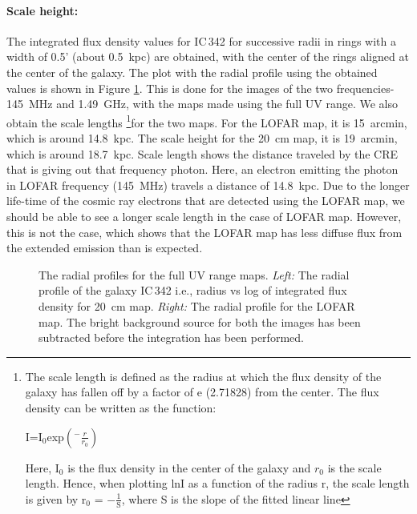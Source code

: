 \documentclass[../main/thesis_msc.tex]{subfiles}
\begin{document}
\paragraph{Scale height:}The integrated flux density values for IC\,342 for successive radii in rings with a width of 0.5' (about 0.5~kpc) are obtained, with the center of the rings aligned at the center of the galaxy. The plot with the radial profile using the obtained values is shown in Figure \ref{ic342_ring}. This is done for the images of the two frequencies- 145~MHz and 1.49~GHz, with the maps made using the full UV range. We also obtain the scale lengths \footnote{The scale length is defined as the radius at which the flux density of the galaxy has fallen off by a factor of e (2.71828) from the center. The flux density can be written as the function: 
\begin{center}
I=I$_0$exp$\left(^-\frac{r}{r_0}\right)$
\end{center}
Here, I$_0$ is the flux density in the center of the galaxy and $r_0$ is the scale length. Hence, when plotting lnI as a function of the radius r, the scale length is given by r$_0$ = $-\frac{1}{\textrm{S}}$, where S is the slope of the fitted linear line}for the two maps. For the LOFAR map, it is 15~arcmin, which is around 14.8~kpc. The scale height for the 20~cm map, it is 19~arcmin, which is around 18.7~kpc. Scale length shows the distance traveled by the CRE that is giving out that frequency photon. Here, an electron emitting the photon in LOFAR frequency (145~MHz) travels a distance of 14.8~kpc. Due to the longer life-time of the cosmic ray electrons that are detected using the LOFAR map, we should be able to see a longer scale length in the case of LOFAR map. However, this is not the case, which shows that the LOFAR map has less diffuse flux from the extended emission than is expected.

\begin{figure}
	\centering
	\caption{The radial profiles for the full UV range maps. \textit{Left:} The radial profile of the galaxy IC\,342 i.e., radius vs log of integrated flux density for 20~cm map. \textit{Right:} The radial profile for the LOFAR map. The bright background source for both the images has been subtracted before the integration has been performed.}
	\label{ic342_ring}
	\end{figure}
\end{document}
